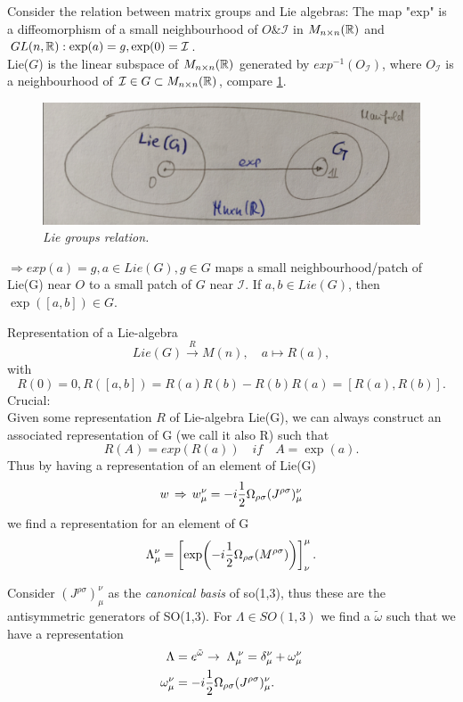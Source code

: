 Consider the relation between matrix groups and Lie algebras: The map "exp" is a diffeomorphism of a small neighbourhood of $O \& \mathcal{I}$ in $M_{n\times n}(\mathbb{R})$ and $GL(n,\mathbb{R}): \exp(a)=g,\exp(0)=\mathcal{I}$.\\
Lie($G$) is the linear subspace of $M_{n\times n}(\mathbb{R})$ generated by $exp^{-1}(O_{\mathcal{I}} )$, where $O_{\mathcal{I}}$ is a neighbourhood of $\mathcal{I}\in G \subset M_{n\times n}(\mathbb{R})$, compare \ref{fig:liegroups}. 
\begin{figure}
	\centering
	\includegraphics[width=0.7\linewidth]{gfx/Liegroups}
	\caption{\itshape Lie groups relation.}
	\label{fig:liegroups}
\end{figure}
$\Rightarrow exp(a)=g, a\in Lie(G), g\in G$ maps a small neighbourhood/patch of Lie(G) near $O$ to a small patch of $G$ near $\mathcal{I}$. If $a,b \in Lie(G)$, then 
$\exp([a,b])\in G$.
\begin{mybox}{Representation of a Lie-algebra}	
	\begin{equation}
	Lie(G) \stackrel{R}{\rightarrow} M(n), \quad a\mapsto R(a),
	\end{equation}
	with
	\begin{equation}
	R(0)=0, R([a,b])=R(a)R(b) -R(b)R(a) = [R(a),R(b)].
	\end{equation}
	Crucial:\\
	Given some representation $R$ of Lie-algebra Lie(G), we can always construct an associated representation of G (we call it also R) such that
	\begin{equation}
	R(A) = exp(R(a)) \quad if\quad A=\exp(a).
	\end{equation}
	Thus by having a representation of an element of Lie(G) 
	\begin{equation}
	w \, \Rightarrow \, w^{\nu} _{\mu}= -i \frac{1}{2} \Omega_{\rho \sigma} (J^{\rho \sigma} )^{\nu}_{\mu} 
	\end{equation}
	we find a representation for an element of G
	\begin{equation}
	\Lambda^{\nu}_{\mu} =\left[\exp(-i \frac{1}{2} \Omega_{\rho \sigma} (M^{\rho \sigma} ))\right]^{\mu}_{\nu}.
	\end{equation}
\end{mybox}
Consider $(J^{\rho \sigma})^{\nu}_{\mu}$ as the \emph{canonical basis} of so(1,3), thus these are the antisymmetric generators of SO(1,3). For $\Lambda \in SO(1,3)$ we find a $\tilde{\omega}$ such that we have a representation
\begin{align}
	\Lambda &= e^{\tilde{\omega}} \rightarrow \; \Lambda^{\;\nu}_{\mu} = \delta^{\nu}_{\mu} + \omega^{\nu}_{\mu} \\
	\omega^{\nu}_{\mu} &= -i \frac{1}{2} \Omega_{\rho \sigma} (J^{\rho \sigma})^{\nu}_{\mu}.
\end{align}

